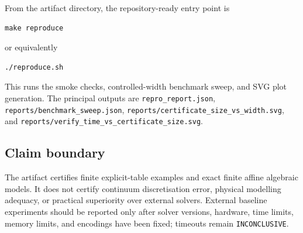 From the artifact directory, the repository-ready entry point is
\begin{verbatim}
make reproduce
\end{verbatim}
or equivalently
\begin{verbatim}
./reproduce.sh
\end{verbatim}
This runs the smoke checks, controlled-width benchmark sweep, and SVG plot
generation. The principal outputs are \texttt{repro\_report.json},
\texttt{reports/benchmark\_sweep.json},
\texttt{reports/certificate\_size\_vs\_width.svg}, and
\texttt{reports/verify\_time\_vs\_certificate\_size.svg}.

\subsection{Claim boundary}

The artifact certifies finite explicit-table examples and exact finite affine
algebraic models. It does not certify continuum discretisation error, physical
modelling adequacy, or practical superiority over external solvers. External
baseline experiments should be reported only after solver versions, hardware,
time limits, memory limits, and encodings have been fixed; timeouts remain
\texttt{INCONCLUSIVE}.
